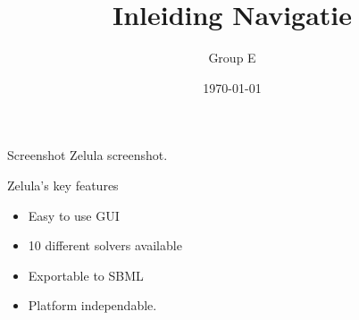 \documentclass[utf8x,outline]{beamer}
\title{Inleiding Navigatie}
\author{Group E}
\institute{TU Delft}
\date{\today}
\begin{document}
\begin{frame}{Screenshot Zelula}
	screenshot.
\end{frame}
\begin{frame}{Zelula's key features}
	\begin{itemize}
		\item Easy to use GUI
		\item 10 different solvers available
		\item Exportable to SBML
		\item Platform independable.
		
	\end{itemize}
\end{frame}
\end{document}
